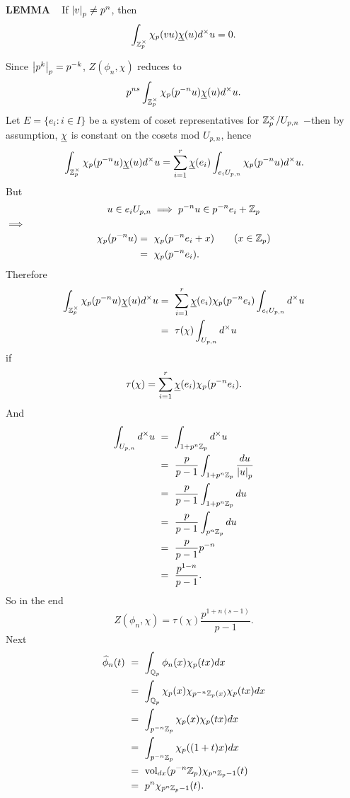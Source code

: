 \begin{x}{\small\bf LEMMA} \ %
If $\left\vert v\right\vert_p \ne p^n$, then
\[
\int_{\mathbb{Z}_p^\times} \chi_p(vu) \underline{\chi}(u) d^\times u = 0.
\]

Since $\left\vert p^k\right\vert_p = p^{-k}$, $Z(\phi_n, \chi)$ reduces to
\[
p^{ns} \int_{\mathbb{Z}_p^\times} \chi_p(p^{-n}u) \underline{\chi}(u) d^\times u.
\]
Let $E = \{e_i: i \in I\}$ be a system of coset representatives for 
$\mathbb{Z}_p^\times  / U_{p,n}$ $-$then by assumption, $\underline{\chi}$ is constant on the cosets mod $U_{p,n}$, hence
\[
\int_{\mathbb{Z}_p^\times} \chi_p(p^{-n}u) \underline{\chi}(u) d^\times u 
= \sum_{i = 1}^r \underline{\chi}(e_i) \int_{e_i U_{p,n}} \chi_p(p^{-n}u) d^\times u.
\]
But
\[
u \in e_i U_{p,n} \implies p^{-n} u \in p^{-n} e_i + \mathbb{Z}_p
\]
$\implies$
\begin{align*}
\chi_p(p^{-n} u) 	
&=\   \chi_p(p^{-n} e_i + x) \qquad ( x \in \mathbb{Z}_p)\\	
&=\ \chi_p(p^{-n} e_i).						
\end{align*}
Therefore
\begin{align*}
\int_{\mathbb{Z}_p^\times} \chi_p(p^{-n} u)  \underline{\chi}(u) d^\times u 	
&=\  \sum_{i = 1}^r \underline{\chi}(e_i)  \chi_p(p^{-n}e_i) \int_{e_i U_{p,n}}  d^\times u\\	
&=\  \tau(\chi) \int_{U_{p,n}}  d^\times u							
\end{align*}
if
\[
 \tau(\chi) = \sum_{i = 1}^r \underline{\chi}(e_i)  \chi_p(p^{-n}e_i).
\]
And
\begin{align*}
\int_{U_{p,n}} d^\times u  \ 
&=\  \int_{1 + p^n \Z_p} d^\times u \\	
&=\  \frac{p}{p-1}\int_{1 + p^n \Z_p} \frac{du}{\abs{u}_p} \\
&=\  \frac{p}{p-1}\int_{1 + p^n \Z_p} du \\
&=\  \frac{p}{p-1}\int_{p^n \Z_p} du \\		
&=\  \frac{p}{p-1} p^{-n } \\
&=\  \frac{p^{1-n}}{p-1}.				
\end{align*}
So in the end
\[
Z(\phi_n, \chi) = \tau(\chi) \frac{p^{1 + n(s - 1)}}{p-1}.
\]
Next
\begin{align*}
\widehat{\phi}_n(t) \ 
&=\  \int_{\Q_p} \phi_n(x) \chi_p(tx) dx \\	
&=\  \int_{\Q_p} \chi_p(x) \chi_{p^{-n}\Z_p (x)}  \chi_p(tx) dx \\
&=\  \int_{p^{-n}\Z_p}  \chi_p(x)  \chi_p(tx) dx \\
&=\  \int_{p^{-n}\Z_p} \chi_p((1+t)x) dx \\	
&=\  \vol_{dx} (p^{-n} \Z_p) \chi_{p^n \Z_p-1} (t)\\	
&=\  p^n\chi_{p^n \Z_p-1} (t).			
\end{align*}


\end{x}

